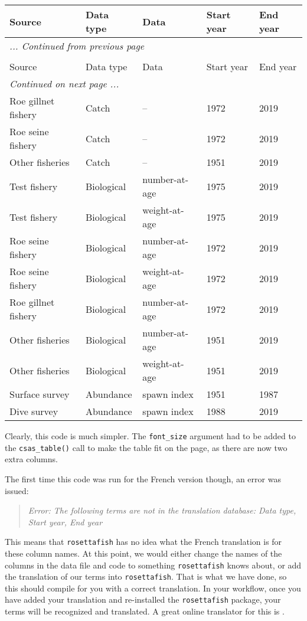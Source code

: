 \documentclass[12pt]{article}\usepackage[]{graphicx}\usepackage[]{color}
\begin{document}
\begingroup\fontsize{10}{12}\selectfont \begingroup\fontsize{10}{12}\selectfont  
\begin{longtable}[t]{lllll} \caption{\label{tab:herring-simple}}\\ \toprule Source & Data type & Data & Start year & End year\\ \midrule \endfirsthead \multicolumn{5}{l}{\textit{... Continued from previous page}} \\ \hline \caption*{}\\ \toprule Source & Data type & Data & Start year & End year\\ \midrule \endhead \hline \multicolumn{5}{l}{\textit{Continued on next page ...}} \\ \endfoot \bottomrule \endlastfoot Roe gillnet fishery & Catch & -- & 1972 & 2019\\ Roe seine fishery & Catch & -- & 1972 & 2019\\ Other fisheries & Catch & -- & 1951 & 2019\\ Test fishery & Biological & number-at-age & 1975 & 2019\\ Test fishery & Biological & weight-at-age & 1975 & 2019\\ Roe seine fishery & Biological & number-at-age & 1972 & 2019\\ Roe seine fishery & Biological & weight-at-age & 1972 & 2019\\ Roe gillnet fishery & Biological & number-at-age & 1972 & 2019\\ Other fisheries & Biological & number-at-age & 1951 & 2019\\ Other fisheries & Biological & weight-at-age & 1951 & 2019\\ Surface survey & Abundance & spawn index & 1951 & 1987\\ Dive survey & Abundance & spawn index & 1988 & 2019\\* \end{longtable}

\endgroup{} \endgroup{} Clearly, this code is much simpler. The \texttt{font\_size} argument had to be added to the \texttt{csas\_table()} call to make the table fit on the page, as there are now two extra columns.

The first time this code was run for the French version though, an error was issued:
\begin{quote}
\emph{Error: The following terms are not in the translation database: Data type, Start year, End year}
\end{quote}
This means that \texttt{rosettafish} has no idea what the French translation is for these column names. At this point, we would either change the names of the columns in the data file and code to something \texttt{rosettafish} knows about, or add the translation of our terms into \texttt{rosettafish}. That is what we have done, so this should compile for you with a correct translation. In your workflow, once you have added your translation and re-installed the \texttt{rosettafish} package, your terms will be recognized and translated. A great online translator for this is .
\end{document}
